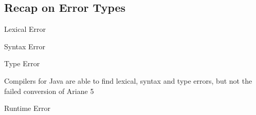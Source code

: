 \subsection{Recap on Error Types}
\begin{frame}{\insertsubsection}
	\begin{fancycolumns}[columns=3,widths={25,35}]
		\begin{exampletight}{Lexical Error}
			\centering\makebox{\usebox{\edgelexicalerror}}
		\end{exampletight}
		\nextcolumn
		\begin{exampletight}{Syntax Error}
			\centering\makebox{\usebox{\edgesyntaxerror}}
		\end{exampletight}
		\nextcolumn
		\begin{exampletight}{Type Error}
			\centering\makebox{\usebox{\edgetypeerror}}
		\end{exampletight}
	\end{fancycolumns}
	\begin{note}{Compilers for Java}
		are able to find lexical, syntax and type errors, but not the failed conversion of Ariane 5
	\end{note}
\end{frame}

\begin{frame}{\insertsubsection}
	\begin{fancycolumns}
		\begin{exampletight}{Runtime Error}
			\centering\makebox{\usebox{\edgeruntimeerror}}
		\end{exampletight}
		\nextcolumn
	\end{fancycolumns}
\end{frame}


